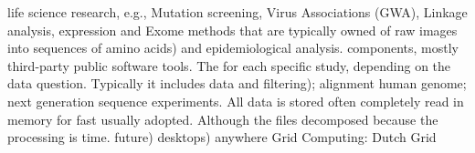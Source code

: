 \documentclass[times]{cpeauth}
\begin{document}
life science research, e.g., Mutation screening, Virus %
Associations (GWA), Linkage analysis, %
expression and Exome %
methods that are %
typically owned %
%
%
of raw images into sequences of amino acids) and %
epidemiological analysis.
%
components, mostly third-party public software tools. The %
for each specific study, depending on the data %
question. Typically it includes data %
and filtering); alignment %
human genome; %
next generation sequence experiments. All data is stored %
often completely read in memory for fast %
usually adopted. Although the files %
decomposed because the processing is %
time.
%
%
%
%
%
%
%
%
%
%
future)
%
%
%
desktops) anywhere Grid Computing: Dutch Grid %
\end{document}
